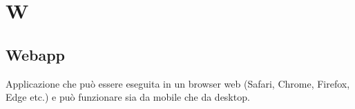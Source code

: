 \section{W}

\subsection{Webapp} Applicazione che può essere eseguita in un browser web (Safari, Chrome, Firefox, Edge etc.) e può funzionare sia da mobile che da desktop.

\clearpage